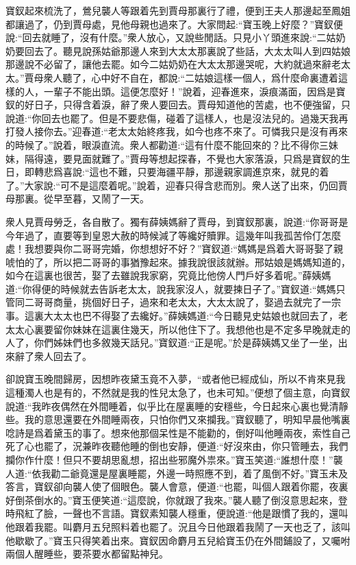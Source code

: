 \begin{parag}
    寶釵起來梳洗了，鶯兒襲人等跟着先到賈母那裏行了禮，便到王夫人那邊起至鳳姐都讓過了，仍到賈母處，見他母親也過來了。大家問起:“寶玉晚上好麼？”寶釵便說:“回去就睡了，沒有什麼。”衆人放心，又說些閒話。只見小丫頭進來說:“二姑奶奶要回去了。聽見說孫姑爺那邊人來到大太太那裏說了些話，大太太叫人到四姑娘那邊說不必留了，讓他去罷。如今二姑奶奶在大太太那邊哭呢，大約就過來辭老太太。”賈母衆人聽了，心中好不自在，都說:“二姑娘這樣一個人，爲什麼命裏遭着這樣的人，一輩子不能出頭。這便怎麼好！”說着，迎春進來，淚痕滿面，因爲是寶釵的好日子，只得含着淚，辭了衆人要回去。賈母知道他的苦處，也不便強留，只說道:“你回去也罷了。但是不要悲傷，碰着了這樣人，也是沒法兒的。過幾天我再打發人接你去。”迎春道:“老太太始終疼我，如今也疼不來了。可憐我只是沒有再來的時候了。”說着，眼淚直流。衆人都勸道:“這有什麼不能回來的？比不得你三妹妹，隔得遠，要見面就難了。”賈母等想起探春，不覺也大家落淚，只爲是寶釵的生日，即轉悲爲喜說:“這也不難，只要海疆平靜，那邊親家調進京來，就見的着了。”大家說:“可不是這麼着呢。”說着，迎春只得含悲而別。衆人送了出來，仍回賈母那裏。從早至暮，又鬧了一天。
\end{parag}


\begin{parag}
    衆人見賈母勞乏，各自散了。獨有薛姨媽辭了賈母，到寶釵那裏，說道:“你哥哥是今年過了，直要等到皇恩大赦的時候減了等纔好贖罪。這幾年叫我孤苦伶仃怎麼處！我想要與你二哥哥完婚，你想想好不好？”寶釵道:“媽媽是爲着大哥哥娶了親唬怕的了，所以把二哥哥的事猶豫起來。據我說很該就辦。邢姑娘是媽媽知道的，如今在這裏也很苦，娶了去雖說我家窮，究竟比他傍人門戶好多着呢。”薛姨媽道:“你得便的時候就去告訴老太太，說我家沒人，就要揀日子了。”寶釵道:“媽媽只管同二哥哥商量，挑個好日子，過來和老太太，大太太說了，娶過去就完了一宗事。這裏大太太也巴不得娶了去纔好。”薛姨媽道:“今日聽見史姑娘也就回去了，老太太心裏要留你妹妹在這裏住幾天，所以他住下了。我想他也是不定多早晚就走的人了，你們姊妹們也多敘幾天話兒。”寶釵道:“正是呢。”於是薛姨媽又坐了一坐，出來辭了衆人回去了。
\end{parag}


\begin{parag}
    卻說寶玉晚間歸房，因想昨夜黛玉竟不入夢，“或者他已經成仙，所以不肯來見我這種濁人也是有的，不然就是我的性兒太急了，也未可知。”便想了個主意，向寶釵說道:“我昨夜偶然在外間睡着，似乎比在屋裏睡的安穩些，今日起來心裏也覺清靜些。我的意思還要在外間睡兩夜，只怕你們又來攔我。”寶釵聽了，明知早晨他嘴裏唸詩是爲着黛玉的事了。想來他那個呆性是不能勸的，倒好叫他睡兩夜，索性自己死了心也罷了，況兼昨夜聽他睡的倒也安靜，便道:“好沒來由，你只管睡去，我們攔你作什麼！但只不要胡思亂想，招出些邪魔外祟來。”寶玉笑道:“誰想什麼！”襲人道:“依我勸二爺竟還是屋裏睡罷，外邊一時照應不到，着了風倒不好。”寶玉未及答言，寶釵卻向襲人使了個眼色。襲人會意，便道:“也罷，叫個人跟着你罷，夜裏好倒茶倒水的。”寶玉便笑道:“這麼說，你就跟了我來。”襲人聽了倒沒意思起來，登時飛紅了臉，一聲也不言語。寶釵素知襲人穩重，便說道:“他是跟慣了我的，還叫他跟着我罷。叫麝月五兒照料着也罷了。況且今日他跟着我鬧了一天也乏了，該叫他歇歇了。”寶玉只得笑着出來。寶釵因命麝月五兒給寶玉仍在外間鋪設了，又囑咐兩個人醒睡些，要茶要水都留點神兒。
\end{parag}


